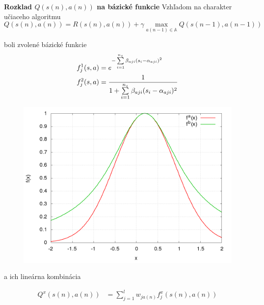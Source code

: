 \documentclass[xcolor=dvipsnames]{beamer}
\begin{document}
\begin{frame}{\bf Rozklad $Q(s(n), a(n))$ na bázické funkcie}
Vzhľadom na charakter učiaceho algoritmu
\begin{equation} \label{eu_eqn}
Q(s(n),a(n)) = R(s(n),a(n)) + \gamma \max_{a(n-1) \in \mathbb{A}} Q(s(n-1), a(n-1)) \nonumber
\end{equation}
\begin{minipage}{.5\textwidth}
  boli zvolené bázické funkcie %
  \begin{align*}
  f_j^1(\boldmath{s, a}) &= e^{ -\sum\limits_{i=1}^{n_s}{\beta_{aji}(s_i - \alpha_{aji})^2} } \\
  f_j^2(\boldmath{s, a}) &= \frac{1}{1 + \sum\limits_{i=1}^{n_s}{\beta_{aji}(s_i - \alpha_{aji})^2}} \\
  \end{align*}
\end{minipage}%
\begin{minipage}{.5\textwidth}

  \begin{figure}[!htb]
  \centering
  \includegraphics[scale=.2]{../pictures/gaussian_1D.png}
  \end{figure}

\end{minipage}

a ich lineárna kombinácia

\begin{align}
    Q^x(s(n), a(n))&= \sum\limits_{j=1}^{l}w_{j a(n)}f^x_{j}(s(n), a(n)) \nonumber
\end{align}

\end{frame}
\end{document}
